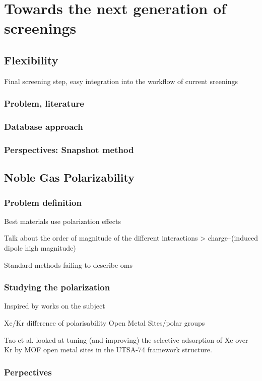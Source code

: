\documentclass[main]{subfiles}
\begin{document}
\chapter{Towards the next generation of screenings}
\vspace*{-1\baselineskip}
\section{Flexibility}
Final screening step, easy integration into the workflow of current sreenings
\subsection{Problem, literature}

\subsection{Database approach}

\subsection{Perspectives: Snapshot method}

\section{Noble Gas Polarizability}

\subsection{Problem definition}

Best materials use polarization effects \autocite{Li_2019,Pei_2022}

Talk about the order of magnitude of the different interactions > charge--(induced dipole high magnitude)

Standard methods failing to describe oms\autocite{Perry_2014} 



\subsection{Studying the polarization}

Inspired by works on the subject\autocite{Lachet_1998,Becker_2017} 


Xe/Kr difference of polarisability
Open Metal Sites/polar groups

Tao et al.\autocite{Tao_2020} looked at tuning (and improving) the selective adsorption of Xe over Kr by MOF open metal sites in the UTSA-74 framework structure.


\subsection{Perpectives}

\OnlyInSubfile{\printglobalbibliography}
\end{document}
